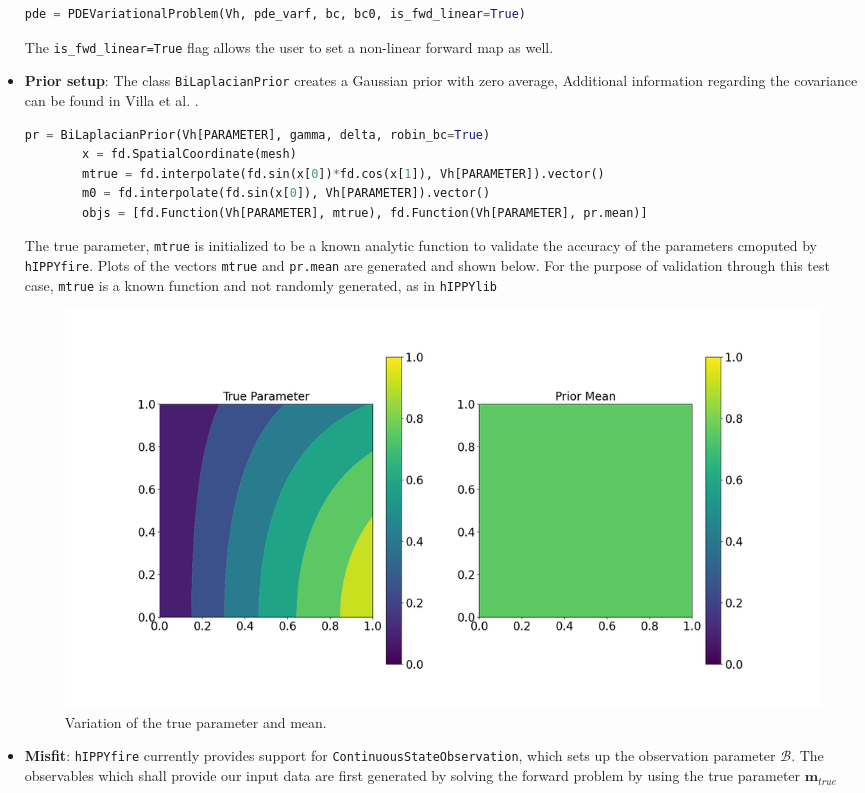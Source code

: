 \begin{itemize}
\begin{lstlisting}[language=python]
        pde = PDEVariationalProblem(Vh, pde_varf, bc, bc0, is_fwd_linear=True)
    \end{lstlisting}
    The \texttt{is\_fwd\_linear=True} flag allows the user to set a non-linear forward map as well.
    \item \textbf{Prior setup}: The class \texttt{BiLaplacianPrior} creates a Gaussian prior with zero average, Additional information regarding the covariance can be found in Villa et al. \cite{Villa_hIPPYlib_An_Extensible_2020}.
    \begin{lstlisting}[language=python]
        pr = BiLaplacianPrior(Vh[PARAMETER], gamma, delta, robin_bc=True)
        x = fd.SpatialCoordinate(mesh)
        mtrue = fd.interpolate(fd.sin(x[0])*fd.cos(x[1]), Vh[PARAMETER]).vector()
        m0 = fd.interpolate(fd.sin(x[0]), Vh[PARAMETER]).vector()
        objs = [fd.Function(Vh[PARAMETER], mtrue), fd.Function(Vh[PARAMETER], pr.mean)]
    \end{lstlisting}
    The true parameter, \texttt{mtrue} is initialized to be a known analytic function to validate the accuracy of the parameters cmoputed by \texttt{hIPPYfire}. Plots of the vectors \texttt{mtrue} and \texttt{pr.mean} are generated and shown below. For the purpose of validation through this test case, \texttt{mtrue} is a known function and not randomly generated, as in \texttt{hIPPYlib} \cite{Villa_hIPPYlib_An_Extensible_2020}
        \begin{figure}[th]
        \centering
        \includegraphics[width=1.0\textwidth]{figures/parameter.png}
        \caption{Variation of the true parameter and mean.}
        \label{figure:parameter}
        \end{figure}
    \item \textbf{Misfit}: \texttt{hIPPYfire} currently provides support for \texttt{ContinuousStateObservation}, which sets up the observation parameter $\mathcal{B}$. The observables which shall provide our input data are first generated by solving the forward problem by using the true parameter $\textbf{m}_{true}$

\end{itemize}
